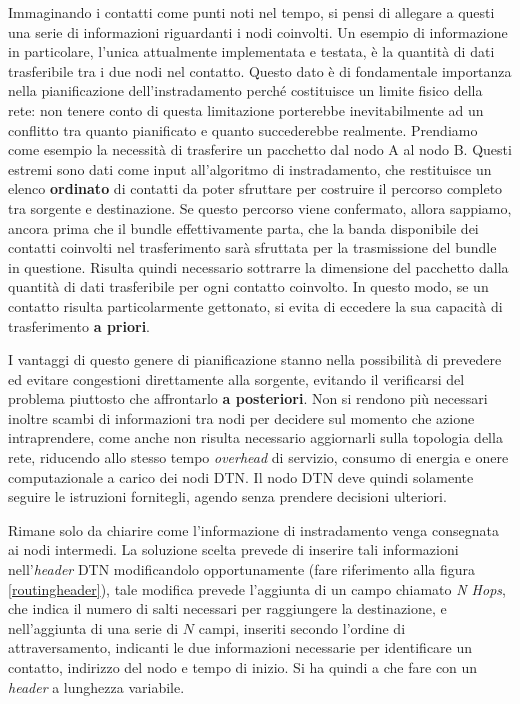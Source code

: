 \documentclass[12pt,a4paper,oneside]{book}
\begin{document}
		Immaginando i contatti come punti noti nel tempo, si pensi di allegare a questi una serie di informazioni riguardanti i nodi coinvolti. Un esempio di informazione in particolare, l'unica attualmente implementata e testata, è la quantità di dati trasferibile tra i due nodi nel contatto. Questo dato è di fondamentale importanza nella pianificazione dell'instradamento perché costituisce un limite fisico della rete: non tenere conto di questa limitazione porterebbe inevitabilmente ad un conflitto tra quanto pianificato e quanto succederebbe realmente. 
		Prendiamo come esempio la necessità di trasferire un pacchetto dal nodo A al nodo B. Questi estremi sono dati come input all'algoritmo di instradamento, che restituisce un elenco \textbf{ordinato} di contatti da poter sfruttare per costruire il percorso completo tra sorgente e destinazione. Se questo percorso viene confermato, allora sappiamo, ancora prima che il bundle effettivamente parta, che la banda disponibile dei contatti coinvolti nel trasferimento sarà sfruttata per la trasmissione del bundle in questione. Risulta quindi necessario sottrarre la dimensione del pacchetto dalla quantità di dati trasferibile per ogni contatto coinvolto. In questo modo, se un contatto risulta particolarmente gettonato, si evita di eccedere la sua capacità di trasferimento {\bf a priori}.
		
		I vantaggi di questo genere di pianificazione stanno nella possibilità di prevedere ed evitare congestioni direttamente alla sorgente, evitando il verificarsi del problema piuttosto che affrontarlo {\bf a posteriori}. Non si rendono più necessari inoltre scambi di informazioni tra nodi per decidere sul momento che azione intraprendere, come anche non risulta necessario aggiornarli sulla topologia della rete, riducendo allo stesso tempo {\it overhead} di servizio, consumo di energia e onere computazionale a carico dei nodi DTN. Il nodo DTN deve quindi solamente seguire le istruzioni fornitegli, agendo senza prendere decisioni ulteriori.
		
		Rimane solo da chiarire come l'informazione di instradamento venga consegnata ai nodi intermedi. La soluzione scelta prevede di inserire tali informazioni nell'{\it header} DTN modificandolo opportunamente (fare riferimento alla figura \ref{routingheader}), tale modifica prevede l'aggiunta di un campo chiamato \emph{N Hops}, che indica il numero di salti necessari per raggiungere la destinazione, e nell'aggiunta di una serie di $N$ campi, inseriti secondo l'ordine di attraversamento, indicanti le due informazioni necessarie per identificare un contatto, indirizzo del nodo e tempo di inizio. Si ha quindi a che fare con un {\it header} a lunghezza variabile.
		
\end{document}
